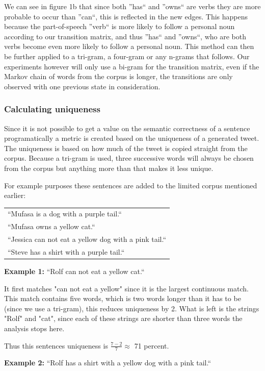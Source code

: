 \documentclass[a4paper,12pt]{article}
\begin{document}
We can see in figure 1b that since both ''has`` and ''owns`` are verbs they are more probable to occur than ''can``, this is reflected in the new edges. 
This happens because the part-of-speech ''verb`` is more likely to follow a personal noun according to our transition matrix, and thus ''has`` and ''owns``, who are 
both verbs become even more likely to follow a personal noun. This method can then be further applied to a tri-gram, a four-gram or any n-grams that follows. 
Our experiments however will only use a bi-gram for the transition matrix, even if the Markov chain of words from the corpus is longer, 
the transitions are only observed with one previous state in consideration.

\subsubsection{Calculating uniqueness}
\label{subsec:calcuniq}
Since it is not possible to get a value on the semantic correctness of a sentence programatically a metric is created based on the uniqueness of a generated tweet. The uniqueness is based on how much of the tweet is copied straight from the corpus.
Because a tri-gram is used, three successive words will always be chosen from the corpus but anything more than that makes it less unique.

For example purposes these sentences are added to the limited corpus mentioned earlier:

\begin{tabular}{l}
``Mufasa is a dog with a purple tail.``\\
``Mufasa owns a yellow cat.``\\
``Jessica can not eat a yellow dog with a pink tail.``\\
``Steve has a shirt with a purple tail.``
\end{tabular}

\textbf{Example 1:} ``Rolf can not eat a yellow cat.``
	
It first matches "can not eat a yellow" since it is the largest continuous match. This match contains five words, which is two words longer than it has to be (since we use a tri-gram), this reduces uniqueness by 2. What is left is the strings "Rolf" and "cat", since each of these strings are shorter than three words the analysis stops here.

Thus this sentences uniqueness is $\frac{7 - 2}{7} \approx$ 71 percent.

\textbf{Example 2:} ``Rolf has a shirt with a yellow dog with a pink tail.``
	
\end{document}
